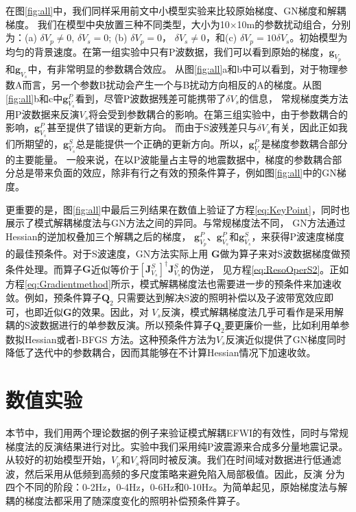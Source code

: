 在图\ref{fig:all}中，我们同样采用前文中小模型实验来比较原始梯度、GN梯度和解耦梯度。
我们在模型中央放置三种不同类型，大小为10$\times$10m的参数扰动组合，分别为：(a) $\delta V_p \neq 0$, $\delta V_s = 0$; (b) $\delta V_p = 0$，
$\delta V_s \neq 0$，和(c) $\delta V_p =10\delta
V_s$。初始模型为均匀的背景速度。在第一组实验中只有P波数据，我们可以看到原始的梯度，$\mathbf{g}_{V_p}$和$\mathbf{g}_{V_s}$中，有非常明显的参数耦合效应。
从图\ref{fig:all}a和b中可以看到，对于物理参数A而言，另一个参数B扰动会产生一个与B扰动方向相反的A的梯度。从图\ref{fig:all}b和c中$\mathbf{g}^{P}_{V_s}$看到，尽管P波数据残差可能携带了$\delta V_s$的信息，
常规梯度类方法用P波数据来反演$V_s$将会受到参数耦合的影响。在第三组实验中，由于参数耦合的影响，$\mathbf{g}^P_{V_s}$甚至提供了错误的更新方向。
而由于S波残差只与$\delta
V_s$有关，因此正如我们所期望的，$\mathbf{g}^S_{V_s}$总是能提供一个正确的更新方向。所以，$\mathbf{g}^P_{V_s}$是梯度参数耦合部分的主要能量。
一般来说，在以P波能量占主导的地震数据中，梯度的参数耦合部分总是带来负面的效应，除非有行之有效的预条件算子，例如图\ref{fig:all}中的GN梯度。

更重要的是，图\ref{fig:all}中最后三列结果在数值上验证了方程\eqref{eq:KeyPoint}，同时也展示了模式解耦梯度法与GN方法之间的异同。与常规梯度法不同，
GN方法通过Hessian的逆加权叠加三个解耦之后的梯度，
$\mathbf{g}^P_{V_p}$、$\mathbf{g}^P_{V_s}$和$\mathbf{g}^S_{V_s}$，来获得P波速度梯度的最佳预条件。对于S波速度，GN方法实际上用
$\mathbf{G}$做为算子来对S波数据梯度做预条件处理。而算子$\mathbf{G}$近似等价于$[\mathbf{J}^{S}_{V_s}]^{\dagger}\mathbf{J}^{S}_{V_s}$的伪逆，
见方程\ref{eq:ResoOperS2}。正如方程\eqref{eq:Gradientmethod}所示，模式解耦梯度法也需要进一步的预条件来加速收敛。例如，预条件算子$\mathbf{Q}_2$
只需要达到解决S波的照明补偿以及子波带宽效应即可，也即近似$\mathbf{G}$的效果。因此，对
$V_s$反演，模式解耦梯度法几乎可看作是采用解耦的S波数据进行的单参数反演。所以预条件算子$\mathbf{Q}_2$要更廉价一些，比如利用单参数拟Hessian或者l-BFGS
方法。这种预条件方法为$V_s$反演近似提供了GN梯度同时降低了迭代中的参数耦合，因而其能够在不计算Hessian情况下加速收敛。

\section{数值实验}
本节中，我们用两个理论数据的例子来验证模式解耦EFWI的有效性，同时与常规梯度法的反演结果进行对比。实验中我们采用纯P波震源来合成多分量地震记录。
从较好的初始模型开始，$V_p$和$V_s$将同时被反演。我们在时间域对数据进行低通滤波，然后采用从低频到高频的多尺度策略来避免陷入局部极值。因此，反演
分为四个不同的阶段：0-2Hz，0-4Hz，0-6Hz和0-10Hz。为简单起见，原始梯度法与解耦的梯度法都采用了随深度变化的照明补偿预条件算子\cite[]{kohn:2012}。
